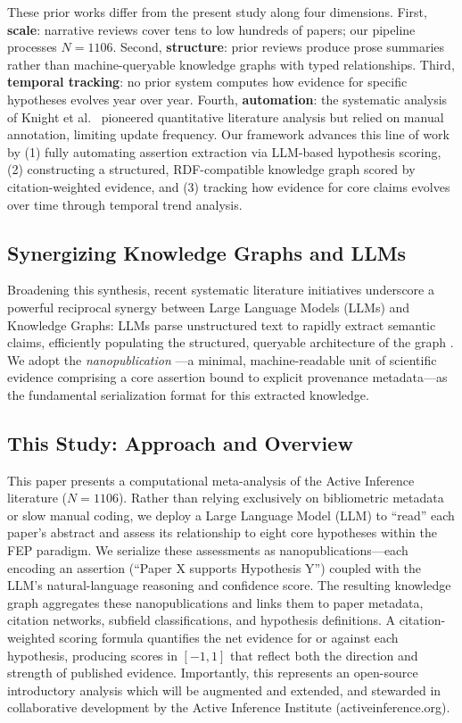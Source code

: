 \documentclass[
  english,
]{article}
\begin{document}
These prior works differ from the present study along four dimensions.
First, \textbf{scale}: narrative reviews cover tens to low hundreds of
papers; our pipeline processes \(N = 1106\). Second, \textbf{structure}:
prior reviews produce prose summaries rather than machine-queryable
knowledge graphs with typed relationships. Third, \textbf{temporal
tracking}: no prior system computes how evidence for specific hypotheses
evolves year over year. Fourth, \textbf{automation}: the systematic
analysis of Knight et al.~\citep{knight2022fep} pioneered quantitative
literature analysis but relied on manual annotation, limiting update
frequency. Our framework advances this line of work by (1) fully
automating assertion extraction via LLM-based hypothesis scoring, (2)
constructing a structured, RDF-compatible knowledge graph scored by
citation-weighted evidence, and (3) tracking how evidence for core
claims evolves over time through temporal trend analysis.

\subsection{Synergizing Knowledge Graphs and
LLMs}\label{synergizing-knowledge-graphs-and-llms}

Broadening this synthesis, recent systematic literature initiatives
underscore a powerful reciprocal synergy between Large Language Models
(LLMs) and Knowledge Graphs: LLMs parse unstructured text to rapidly
extract semantic claims, efficiently populating the structured,
queryable architecture of the graph
\citep{quevedo2025combining, li2024unifying}. We adopt the
\emph{nanopublication} \citep{groth2010anatomy}---a minimal,
machine-readable unit of scientific evidence comprising a core assertion
bound to explicit provenance metadata---as the fundamental serialization
format for this extracted knowledge.

\subsection{This Study: Approach and
Overview}\label{this-study-approach-and-overview}

This paper presents a computational meta-analysis of the Active
Inference literature (\(N = 1106\)). Rather than relying exclusively on
bibliometric metadata or slow manual coding, we deploy a Large Language
Model (LLM) to ``read'' each paper's abstract and assess its
relationship to eight core hypotheses within the FEP paradigm. We
serialize these assessments as nanopublications---each encoding an
assertion (``Paper X supports Hypothesis Y'') coupled with the LLM's
natural-language reasoning and confidence score. The resulting knowledge
graph aggregates these nanopublications and links them to paper
metadata, citation networks, subfield classifications, and hypothesis
definitions. A citation-weighted scoring formula quantifies the net
evidence for or against each hypothesis, producing scores in \([-1, 1]\)
that reflect both the direction and strength of published evidence.
Importantly, this represents an open-source introductory analysis which
will be augmented and extended, and stewarded in collaborative
development by the Active Inference Institute (activeinference.org).
\end{document}
